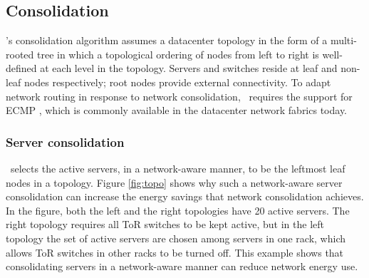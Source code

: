 %

\subsection{Consolidation}
\label{sec:consolidation}
\shrink's consolidation algorithm assumes a datacenter topology in the form of a multi-rooted tree in which a topological ordering of nodes from left to right is well-defined at each level in the topology.  Servers and switches reside at leaf and non-leaf nodes respectively; root nodes provide external connectivity. To adapt network routing in response to network consolidation, \shrink\ requires the support for ECMP \cite{hopps2000analysis}, which is commonly available in the datacenter network fabrics today. 


\subsubsection{Server consolidation}
\label{sec:serverconsolidation}




\shrink\ selects the active servers, in a network-aware manner, to be the leftmost leaf nodes in a topology. Figure \ref{fig:topo} shows why such a network-aware server consolidation can increase the energy savings that network consolidation achieves. In the figure, both the left and the right topologies  have 20 active servers.  The right topology requires all ToR switches to be kept active, but in the left topology the set of active servers are chosen among servers in one rack, which allows ToR switches in other racks to be turned off.  This example shows that consolidating servers in a network-aware manner can reduce network energy use.

